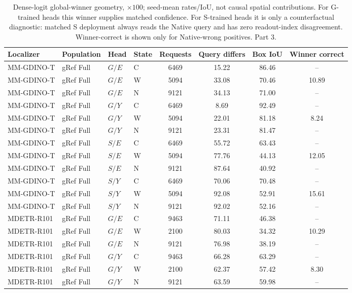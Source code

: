 \begin{table}[t]
\centering\footnotesize
\setlength{\tabcolsep}{3pt}
\renewcommand{\arraystretch}{1.15}
\caption{Dense-logit global-winner geometry, $\times100$; seed-mean rates/IoU, not causal spatial contributions. For G-trained heads this winner supplies matched confidence. For S-trained heads it is only a counterfactual diagnostic: matched S deployment always reads the Native query and has zero readout-index disagreement. Winner-correct is shown only for Native-wrong positives. Part 3.}\label{tab:supp_v6_winner_geometry_3}
\begin{tabular}{@{}llllcccc@{}}\toprule
Localizer & Population & Head & State & Requests & Query differs & Box IoU & Winner correct\\\midrule
MM-GDINO-T & gRef Full & $G/E$ & C & 6469 & 15.22 & 86.46 & --\\
MM-GDINO-T & gRef Full & $G/E$ & W & 5094 & 33.08 & 70.46 & 10.89\\
MM-GDINO-T & gRef Full & $G/E$ & N & 9121 & 34.13 & 71.00 & --\\
MM-GDINO-T & gRef Full & $G/Y$ & C & 6469 & 8.69 & 92.49 & --\\
MM-GDINO-T & gRef Full & $G/Y$ & W & 5094 & 22.01 & 81.18 & 8.24\\
MM-GDINO-T & gRef Full & $G/Y$ & N & 9121 & 23.31 & 81.47 & --\\
MM-GDINO-T & gRef Full & $S/E$ & C & 6469 & 55.72 & 63.43 & --\\
MM-GDINO-T & gRef Full & $S/E$ & W & 5094 & 77.76 & 44.13 & 12.05\\
MM-GDINO-T & gRef Full & $S/E$ & N & 9121 & 87.64 & 40.92 & --\\
MM-GDINO-T & gRef Full & $S/Y$ & C & 6469 & 70.06 & 70.48 & --\\
MM-GDINO-T & gRef Full & $S/Y$ & W & 5094 & 92.08 & 52.91 & 15.61\\
MM-GDINO-T & gRef Full & $S/Y$ & N & 9121 & 92.02 & 52.16 & --\\
MDETR-R101 & gRef Full & $G/E$ & C & 9463 & 71.11 & 46.38 & --\\
MDETR-R101 & gRef Full & $G/E$ & W & 2100 & 80.03 & 34.32 & 10.29\\
MDETR-R101 & gRef Full & $G/E$ & N & 9121 & 76.98 & 38.19 & --\\
MDETR-R101 & gRef Full & $G/Y$ & C & 9463 & 66.28 & 63.29 & --\\
MDETR-R101 & gRef Full & $G/Y$ & W & 2100 & 62.37 & 57.42 & 8.30\\
MDETR-R101 & gRef Full & $G/Y$ & N & 9121 & 63.59 & 59.98 & --\\

\end{tabular}
\end{table}
